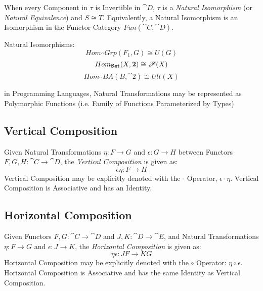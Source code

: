 When every Component in $\tau$ is Invertible in $\cat{D}$, $\tau$
is a \emph{Natural Isomorphism} (or \emph{Natural Equivalence}) and $S
\cong T$. Equivalently, a Natural Isomorphism is an Isomorphism in the
Functor Category $Fun(\cat{C},\cat{D})$.

Natural Isomorphisms:
\[
  Hom_\cat{Grp}(F_1,G) \cong U(G)
\]\[
  Hom_\mathbf{Set}(X,\mathbf{2}) \cong \mathscr{P}(X)
\]\[
  Hom_\cat{BA}(B,\cat{2}) \cong Ult(X)
\]

in Programming Languages, Natural Transformations may be represented
as Polymorphic Functions (i.e. Family of Functions Parameterized by
Types)



\subsection{Vertical Composition}\label{sec:vertical_composition}

Given Natural Transformations $\eta : F \rightarrow G$ and $\epsilon :
G \rightarrow H$ between Functors $F,G,H : \cat{C} \rightarrow
\cat{D}$, the \emph{Vertical Composition} is given as:
\[
  \epsilon \eta : F \rightarrow H
\]
Vertical Composition may be explicitly denoted with the $\cdot$
Operator, $\epsilon \cdot \eta$. Vertical Composition is Associative
and has an Identity.



\subsection{Horizontal Composition}\label{sec:horizontal_composition}

Given Functors $F,G : \cat{C} \rightarrow \cat{D}$ and $J,K :
\cat{D} \rightarrow \cat{E}$, and Natural Transformations $\eta
: F \rightarrow G$ and $\epsilon : J \rightarrow K$, the
\emph{Horizontal Composition} is given as:
\[
  \eta \epsilon : JF \rightarrow KG
\]
Horizontal Composition may be explicitly denoted with the $\circ$
Operator: $\eta \circ \epsilon$. Horizontal Composition is Associative
and has the same Identity as Vertical Composition.



